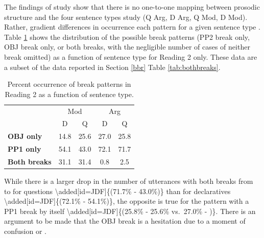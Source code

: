 \documentclass[12pt,oneside]{book}
\begin{document}
The findings of  study show that there is no one-to-one mapping between prosodic structure and the four sentence types  study (Q Arg, D Arg, Q Mod, D Mod). Rather,   gradient differences in occurrence  each pattern for a given sentence type .  Table \ref{tab:combobr} shows the distribution of the possible  break patterns (PP2 break only, OBJ break only, or both breaks, with the negligible number of cases of neither break omitted) as a function of sentence type for Reading 2 only. These data are a subset of the data reported in Section \ref{bbr} Table \ref{tab:bothbreaks}.

\begin{table}[!h]

\caption{\label{tab:combobr}Percent occurrence of break patterns in Reading 2 as a function of sentence type.}
\centering
\begin{tabular}{>{\bfseries}lcccc}
\toprule
\multicolumn{1}{c}{ } & \multicolumn{2}{c}{Mod} & \multicolumn{2}{c}{Arg} \\
\cmidrule(l{3pt}r{3pt}){2-3} \cmidrule(l{3pt}r{3pt}){4-5}
  & D & Q & D & Q\\
\midrule
OBJ only & 14.8 & 25.6 & 27.0 & 25.8\\
PP1 only & 54.1 & 43.0 & 72.1 & 71.7\\
Both breaks & 31.1 & 31.4 & 0.8 & 2.5\\
\bottomrule
\end{tabular}
\end{table}

While there is a larger drop in the number of utterances with both breaks from  to  for questions \textbackslash{}added{[}id=JDF{]}\{(71.7\% - 43.0\%)\} than for declaratives \textbackslash{}added{[}id=JDF{]}\{(72.1\% - 54.1\%)\}, the opposite is true for the pattern with a PP1 break by itself \textbackslash{}added{[}id=JDF{]}\{(25.8\% - 25.6\% vs.~27.0\% - )\}. There is an argument to be made that the OBJ break is  a hesitation  due to a moment of confusion or .
\end{document}

